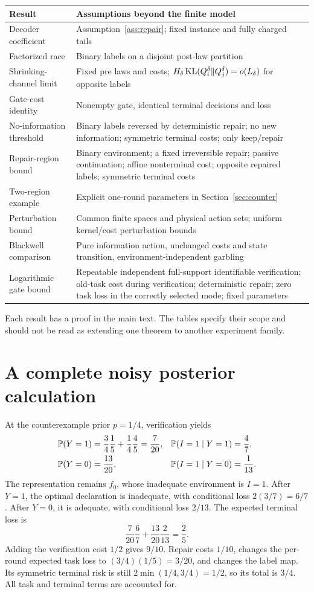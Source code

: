 \begin{longtable}{p{.26\linewidth}p{.64\linewidth}}
\toprule
Result & Assumptions beyond the finite model\\
\midrule
Decoder coefficient & Assumption~\ref{ass:repair}; fixed instance and fully charged tails\\
Factorized race & Binary labels on a disjoint post-law partition\\
Shrinking-channel limit & Fixed pre laws and costs; $H_\delta\operatorname{KL}(Q_i^\delta\Vert Q_j^\delta)=o(L_\delta)$ for opposite labels\\
Gate-cost identity & Nonempty gate, identical terminal decisions and loss\\
No-information threshold & Binary labels reversed by deterministic repair;
no new information; symmetric terminal costs; only keep/repair\\
Repair-region bound & Binary environment; a fixed irreversible repair;
passive continuation; affine nonterminal cost; opposite repaired labels;
symmetric terminal costs\\
Two-region example & Explicit one-round parameters in Section~\ref{sec:counter}\\
Perturbation bound & Common finite spaces and physical action sets;
uniform kernel/cost perturbation bounds\\
Blackwell comparison & Pure information action, unchanged costs and state
transition, environment-independent garbling\\
Logarithmic gate bound & Repeatable independent full-support identifiable
verification; old-task cost during verification; deterministic repair;
zero task loss in the correctly selected mode; fixed parameters\\
\bottomrule
\end{longtable}
Each result has a proof in the main text. The tables specify their scope and
should not be read as extending one theorem to another experiment family.

\section{A complete noisy posterior calculation}
At the counterexample prior $p=1/4$, verification yields
\begin{align*}
\mathbb P(Y=1)&=\frac34\frac15+\frac14\frac45=\frac7{20},
&
\mathbb P(I=1\mid Y=1)&=\frac47,\\
\mathbb P(Y=0)&=\frac{13}{20},
&
\mathbb P(I=1\mid Y=0)&=\frac1{13}.
\end{align*}
The representation remains $f_0$, whose inadequate environment is $I=1$.
After $Y=1$, the optimal declaration is inadequate, with conditional loss
$2(3/7)=6/7$. After $Y=0$, it is adequate, with conditional loss $2/13$.
The expected terminal loss is
\[
\frac7{20}\frac67+\frac{13}{20}\frac2{13}=\frac25.
\]
Adding the verification cost $1/2$ gives $9/10$.
Repair costs $1/10$, changes the per-round expected task loss to
$(3/4)(1/5)=3/20$, and changes the label map. Its symmetric terminal risk is
still $2\min(1/4,3/4)=1/2$, so its total is $3/4$.
All task and terminal terms are accounted for.

